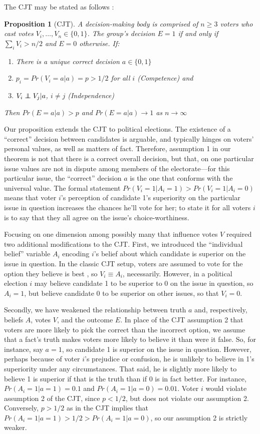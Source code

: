\documentclass[11pt]{article}
\def\independenT#1#2{\mathrel{\rlap{$#1#2$}\mkern2mu{#1#2}}}
\newcommand\independent{\protect\mathpalette{\protect\independenT}{\perp}}
\newtheorem*{prop*}{Proposition}
\begin{document}
The CJT may be stated as follows \citep[e.g.][]{boland1989majority}:
\begin{prop*}[CJT]
A decision-making body is comprised of $n\ge 3$ voters who cast votes
$V_i,\dots,V_n\in \{0,1\}$. The group's decision $E= 1$ if and only if
$\sum_i V_i>n/2$ and $E=0$ otherwise.
If:
\begin{enumerate}
\item There is a unique correct decision $a\in \{0,1\}$
\item $p_i=Pr(V_i=a|a)=p>1/2$ for all $i$ (Competence) and
\item $V_i \independent V_j|a$, $i\ne j$ (Independence)
\end{enumerate}
Then $Pr(E=a|a)>p$ and $Pr(E=a|a)\rightarrow 1$ as
$n\rightarrow\infty$
\end{prop*}

Our proposition extends the CJT to political elections.
The existence of a ``correct'' decision
between candidates is arguable, and typically hinges on voters'
personal values, as well as matters of fact.
Therefore, assumption 1 in our theorem is not that there is a correct
overall decision, but that, on one particular issue values are not in
dispute among members of the electorate---for this particular issue,
the ``correct'' decision $a$ is the one that conforms with the
universal value.
The formal statement $Pr(V_i=1|A_i=1) > Pr(V_i=1|A_i=0)$ means
that voter $i$'s perception of candidate 1's superiority on the
particular issue in question increases the chances he'll vote for
her; to state it for all voters $i$ is to say that they all agree on
the issue's choice-worthiness.

Focusing on one dimension among possibly many that influence votes $V$
required two additional modifications to the CJT.
First, we introduced the ``individual belief'' variable $A_i$ encoding
$i$'s belief about which candidate is superior on the issue in
question.
In the classic CJT setup, voters are assumed to vote for the option
they believe is best \citep[See][however]{austen1996information}, so
$V_i\equiv A_i$, necessarily.
However, in a political election $i$ may believe candidate 1 to be
superior to 0 on the issue in question, so $A_i=1$, but believe
candidate 0 to be superior on other issues, so that $V_i=0$.

Secondly, we have weakened the relationship between truth $a$ and,
respectively, beliefs $A$, votes $V$, and the outcome $E$.
In place of the CJT assumption 2 that voters are more likely to pick
the correct than the incorrect option, we assume that a fact's truth
makes voters more likely to believe it than were it false.
So, for instance, say $a=1$, so candidate 1 is superior on the issue
in question.
However, perhaps because of voter $i$'s prejudice or confusion, he is
unlikely to believe in 1's superiority under any circumstances.
That said, he is slightly more likely to believe 1 is superior if that
is the truth than if 0 is in fact better.
For instance, $Pr(A_i=1|a=1)=0.1$ and $Pr(A_i=1|a=0)=0.01$.
Voter $i$ would violate assumption 2 of the CJT, since $p<1/2$, but
does not violate our assumption 2.
Conversely, $p>1/2$ as in the CJT implies that
$Pr(A_i=1|a=1)>1/2>Pr(A_i=1|a=0)$, so our assumption 2 is strictly
weaker.
\end{document}
